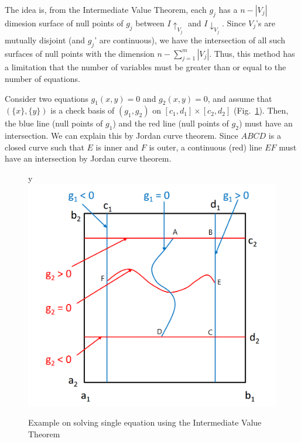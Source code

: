 \documentclass[runningheads,a4paper,oribibl]{llncs}
\begin{document}
The idea is, from the Intermediate Value Theorem,
each $g_j$ has a $n - |V_{j}|$ dimesion surface of null points of $g_j$
between $I\uparrow_{V_j}$ and $I\downarrow_{V_j}$. 
Since $V_j$'s are mutually disjoint (and $g_j$' are continuous),
we have the intersection of all such surfaces of null points with
the dimension $n - \sum_{j=1}^m |V_j|$.
Thus, this method has a limitation that 
the number of variables must be greater than or equal to the number of equations.

\begin{example}
  Consider two equations $g_1(x, y)=0$ and $g_2(x, y) = 0$, and assume that $(\{x\}, \{y\})$
  is a check basis of $(g_1, g_2)$ on $[c_1,d_1] \times [c_2,d_2]$ (Fig.~\ref{fig:multiple-equations}).
  Then, the blue line (null points of $g_1$) and the red line (null points of $g_2$) must have
  an intersection. We can explain this by Jordan curve theorem. 
  Since $ABCD$ is a closed curve such that $E$ is inner and $F$ is outer,
  a continuous (red) line $EF$ must have an intersection by Jordan curve theorem. 
\end{example}
\begin{figure}[ht]
\centering
y\includegraphics[scale=0.25]{multipleEquations.png} 
\caption{Example on solving single equation using the Intermediate Value Theorem} 
\label{fig:multiple-equations} 
\end{figure}
\end{document}
